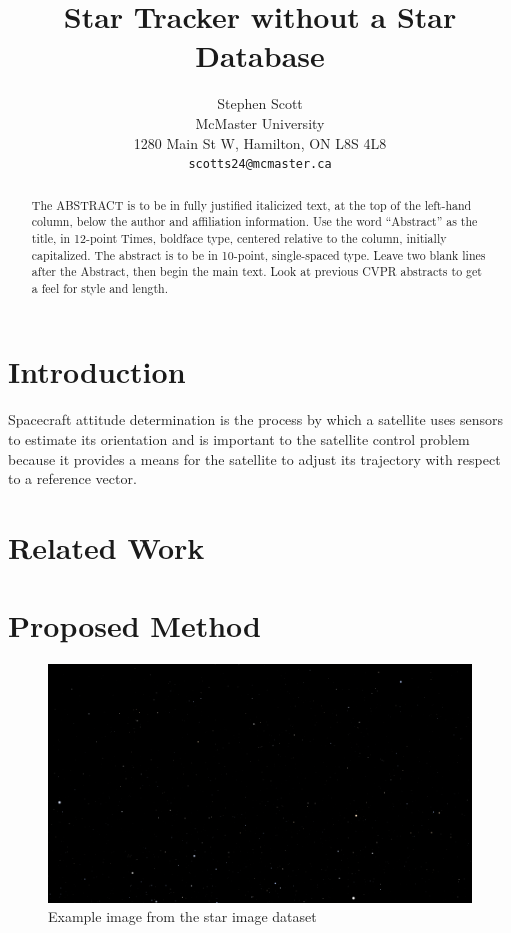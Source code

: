 \documentclass[10pt,twocolumn,letterpaper]{article}
\begin{document}
\title{Star Tracker without a Star Database}

\author{Stephen Scott\\
McMaster University\\
1280 Main St W, Hamilton, ON L8S 4L8\\
{\tt\small scotts24@mcmaster.ca}
}
\maketitle

\begin{abstract}
   The ABSTRACT is to be in fully justified italicized text, at the top of the left-hand column, below the author and affiliation information.
   Use the word ``Abstract'' as the title, in 12-point Times, boldface type, centered relative to the column, initially capitalized.
   The abstract is to be in 10-point, single-spaced type.
   Leave two blank lines after the Abstract, then begin the main text.
   Look at previous CVPR abstracts to get a feel for style and length.
\end{abstract}

\section{Introduction}
\label{sec:intro}

Spacecraft attitude determination is the process by which a satellite uses sensors to estimate its orientation and is important to the satellite control problem because it provides a means for the satellite to adjust its trajectory with respect to a reference vector.

\section{Related Work}
\label{sec:related}

\section{Proposed Method}
\label{sec:method}

\begin{figure}[h]
  \centering
   \includegraphics[width=0.9\linewidth]{stars_000}
   \caption{Example image from the star image dataset}
   \label{fig:star_img}
\end{figure}
\end{document}
